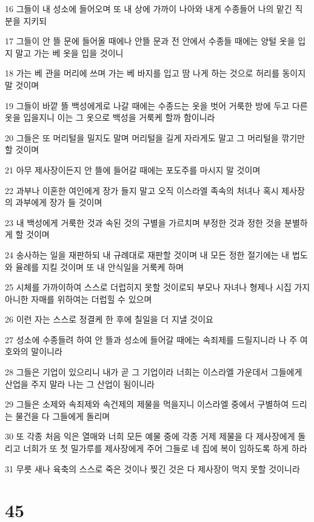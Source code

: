 \par 16 그들이 내 성소에 들어오며 또 내 상에 가까이 나아와 내게 수종들어 나의 맡긴 직분을 지키되
\par 17 그들이 안 뜰 문에 들어올 때에나 안뜰 문과 전 안에서 수종들 때에는 양털 옷을 입지 말고 가는 베 옷을 입을 것이니
\par 18 가는 베 관을 머리에 쓰며 가는 베 바지를 입고 땀 나게 하는 것으로 허리를 동이지 말 것이며
\par 19 그들이 바깥 뜰 백성에게로 나갈 때에는 수종드는 옷을 벗어 거룩한 방에 두고 다른 옷을 입을지니 이는 그 옷으로 백성을 거룩케 할까 함이니라
\par 20 그들은 또 머리털을 밀지도 말며 머리털을 길게 자라게도 말고 그 머리털을 깎기만 할 것이며
\par 21 아무 제사장이든지 안 뜰에 들어갈 때에는 포도주를 마시지 말 것이며
\par 22 과부나 이혼한 여인에게 장가 들지 말고 오직 이스라엘 족속의 처녀나 혹시 제사장의 과부에게 장가 들 것이며
\par 23 내 백성에게 거룩한 것과 속된 것의 구별을 가르치며 부정한 것과 정한 것을 분별하게 할 것이며
\par 24 송사하는 일을 재판하되 내 규례대로 재판할 것이며 내 모든 정한 절기에는 내 법도와 율례를 지킬 것이며 또 내 안식일을 거룩케 하며
\par 25 시체를 가까이하여 스스로 더럽히지 못할 것이로되 부모나 자녀나 형제나 시집 가지 아니한 자매를 위하여는 더럽힐 수 있으며
\par 26 이런 자는 스스로 정결케 한 후에 칠일을 더 지낼 것이요
\par 27 성소에 수종들려 하여 안 뜰과 성소에 들어갈 때에는 속죄제를 드릴지니라 나 주 여호와의 말이니라
\par 28 그들은 기업이 있으리니 내가 곧 그 기업이라 너희는 이스라엘 가운데서 그들에게 산업을 주지 말라 나는 그 산업이 됨이니라
\par 29 그들은 소제와 속죄제와 속건제의 제물을 먹을지니 이스라엘 중에서 구별하여 드리는 물건을 다 그들에게 돌리며
\par 30 또 각종 처음 익은 열매와 너희 모든 예물 중에 각종 거제 제물을 다 제사장에게 돌리고 너희가 또 첫 밀가루를 제사장에게 주어 그들로 네 집에 복이 임하도록 하게 하라
\par 31 무릇 새나 육축의 스스로 죽은 것이나 찢긴 것은 다 제사장이 먹지 못할 것이니라

\chapter{45}


